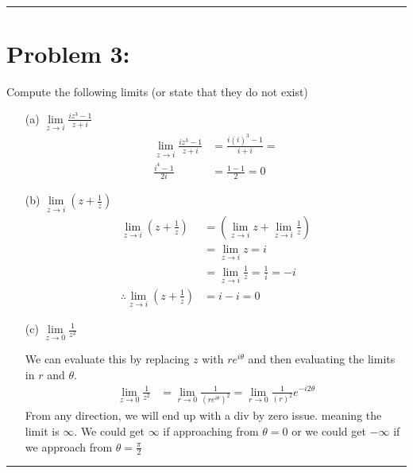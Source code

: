 \documentclass{article}
\begin{document}
\vspace{1cm} %

\hrule

\newpage
\section*{Problem 3:}
Compute the following limits (or state that they do not exist)
\begin{enumerate}
\item[(a)] $\lim\limits_{z \to i} \frac{iz^3 - 1}{z + i}$
  \begin{align*}
    \lim\limits_{z \to i} \frac{iz^3 - 1}{z + i} &=  \frac{i(i)^3 - 1}{i + i} =\\
    \frac{i^4-1}{2i} &= \frac{1-1}{2} = 0
  \end{align*}
  \item[(b)] $\lim\limits_{z \to i}\left(z + \frac{1}{z}\right)$
    \begin{align*}
      \lim\limits_{z \to i}\left(z + \frac{1}{z}\right) &= \left(\lim\limits_{z \to i}z + \lim\limits_{z \to i}\frac{1}{z}\right)\\
                                                        &= \lim\limits_{z \to i}z = i \\
                                                        &= \lim\limits_{z \to i}\frac{1}{z} = \frac{1}{i} = -i\\
    \therefore  \lim\limits_{z \to i}\left(z + \frac{1}{z}\right) &= i -i = 0
    \end{align*}
  \item[(c)] $\lim\limits_{z \to 0}\frac{1}{z^2}$
    
    We can evaluate this by replacing $z$ with $re^{i\theta}$ and then evaluating the limits in $r$ and $\theta$. 
    \begin{align*}
      \lim\limits_{z \to 0}\frac{1}{z^2}  &=  \lim\limits_{r \to 0}\frac{1}{(re^{i\theta})^2} = \lim\limits_{r \to 0}\frac{1}{(r)^2}e^{-i2\theta}   
    \end{align*}
    From any direction, we will end up with a div by zero issue. meaning the limit is $\infty$. We could get $\infty$ if approaching from $\theta = 0$ or we could get $-\infty$ if we approach from $\theta = \frac{\pi}{2}$
\end{enumerate}
\vspace{1cm} %

\hrule

\newpage
\end{document}
